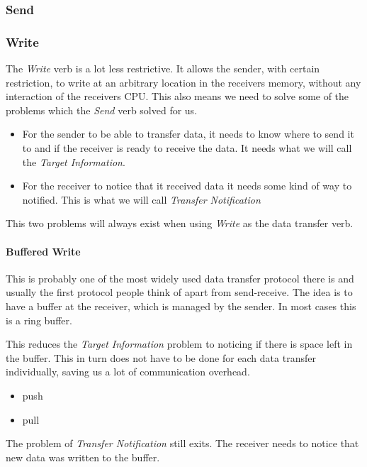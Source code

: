 \subsubsection{Send}

\subsubsection{Write}
The \emph{Write} verb is a lot less restrictive. It allows the sender, with certain restriction, to write at an arbitrary 
location in the receivers memory, without any interaction of the receivers CPU. This also means we need to solve some of the 
problems which the \emph{Send} verb solved for us.

\begin{itemize}
  \item For the sender to be able to transfer data, it needs to know where to send it to and if the receiver is ready 
to receive the data. It needs what we will call the \emph{Target Information}.

  \item For the receiver to notice that it received data it needs some kind of way to notified. This is what we will
call \emph{Transfer Notification}
\end{itemize}

This two problems will always exist when using \emph{Write} as the data transfer verb. 

\paragraph{Buffered Write}
This is probably one of the most widely used data transfer protocol there is and usually the first protocol people think of
apart from send-receive. The idea is to have a buffer at the receiver, which is managed by the sender. In most cases this is 
a ring buffer. 

This reduces the \emph{Target Information} problem to noticing if there is space left in the buffer. This in turn does not 
have to be done for each data transfer individually, saving us a lot of communication overhead.

\begin{itemize}
  \item push
  \item pull
\end{itemize}

The problem of \emph{Transfer Notification} still exits. The receiver needs to notice that new data was written to the buffer.

